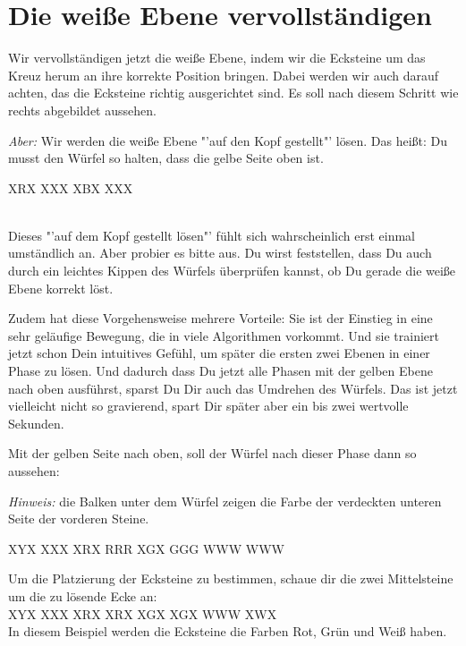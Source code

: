 \section{Die weiße Ebene vervollständigen}
\parbox{0.7\linewidth}{
Wir vervollständigen jetzt die weiße Ebene, indem wir die Ecksteine um das Kreuz herum an ihre korrekte Position bringen.
Dabei werden wir auch darauf achten, das die Ecksteine richtig ausgerichtet sind.
Es soll nach diesem Schritt wie rechts abgebildet aussehen.

\emph{Aber:} Wir werden die weiße Ebene "'auf den Kopf gestellt"' lösen.
Das heißt: Du musst den Würfel so halten, dass die gelbe Seite oben ist.
}\parbox{0.3\linewidth}{
\RubikCubeGreyAll%
%
               {X}{R}{X}
	       {X}{X}{X}%
	       {X}{B}{X}
	       {X}{X}{X}%
}\\[1em]
Dieses "'auf dem Kopf gestellt lösen"' fühlt sich wahrscheinlich erst einmal umständlich an.
Aber probier es bitte aus.
Du wirst feststellen, dass Du auch durch ein leichtes Kippen des Würfels überprüfen kannst, ob Du gerade die weiße Ebene korrekt löst.

\enlargethispage{\baselineskip}
Zudem hat diese Vorgehensweise mehrere Vorteile:
Sie ist der Einstieg in eine sehr geläufige Bewegung, die in viele Algorithmen vorkommt.
Und sie trainiert jetzt schon Dein intuitives Gefühl, um später die ersten zwei Ebenen in einer Phase zu lösen.
Und dadurch dass Du jetzt alle Phasen mit der gelben Ebene nach oben ausführst, sparst Du Dir auch das Umdrehen des Würfels.
Das ist jetzt vielleicht nicht so gravierend, spart Dir später aber ein bis zwei wertvolle Sekunden.\\[1em]
\parbox{0.7\linewidth}{
Mit der gelben Seite nach oben, soll der Würfel nach dieser Phase dann so aussehen:

\emph{Hinweis:} die Balken unter dem Würfel zeigen die Farbe der verdeckten unteren Seite der vorderen Steine.
}\parbox{0.3\linewidth}{
\RubikCubeGreyAll%
            {X}{Y}{X}
            {X}{X}{X}%
               {X}{R}{X}
	       {R}{R}{R}%
	       {X}{G}{X}
	       {G}{G}{G}%
	      {W}{W}{W}
	      {W}{W}{W}%
}

Um die Platzierung der Ecksteine zu bestimmen, schaue dir die zwei Mittelsteine um die zu lösende Ecke an:\\[1em]
\RubikCubeGreyAll%
            {X}{Y}{X}
            {X}{X}{X}%
               {X}{R}{X}
	       {X}{R}{X}%
	       {X}{G}{X}
	       {X}{G}{X}%
	      {W}{W}{W}
	      {X}{W}{X}%
\\[1em]
In diesem Beispiel werden die Ecksteine die Farben Rot, Grün und Weiß haben.

